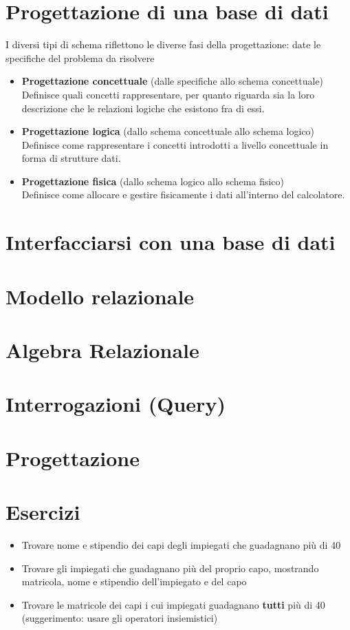 \documentclass{article}
\begin{document}
	\section{Progettazione di una base di dati}
	I diversi tipi di schema riflettono le diverse fasi della progettazione: date le specifiche del problema da risolvere
	\begin{itemize}
		\item \textbf{Progettazione concettuale} (dalle specifiche allo schema concettuale) \\
		Definisce quali concetti rappresentare, per quanto riguarda sia la loro descrizione che le relazioni logiche che esistono fra di essi.
		\item \textbf{Progettazione logica} (dallo schema concettuale allo schema logico) \\
		Definisce come rappresentare i concetti introdotti a livello concettuale in forma di strutture dati.
		\item \textbf{Progettazione fisica} (dallo schema logico allo schema fisico) \\
		Definisce come allocare e gestire fisicamente i dati all’interno del calcolatore.
	\end{itemize}
	\section{Interfacciarsi con una base di dati}
	
	\section{Modello relazionale}
	
	\section{Algebra Relazionale}
	
	\section{Interrogazioni (Query)}
	
	\section{Progettazione}
	
	\section{Esercizi}
	\begin{itemize}
		\item Trovare nome e stipendio dei capi degli impiegati che guadagnano più di 40
		\item Trovare gli impiegati che guadagnano più del proprio capo, mostrando matricola, nome e stipendio dell'impiegato e del capo
		\item Trovare le matricole dei capi i cui impiegati guadagnano \textbf{tutti} più di 40 (suggerimento: usare gli operatori insiemistici)
	\end{itemize}
\end{document}
